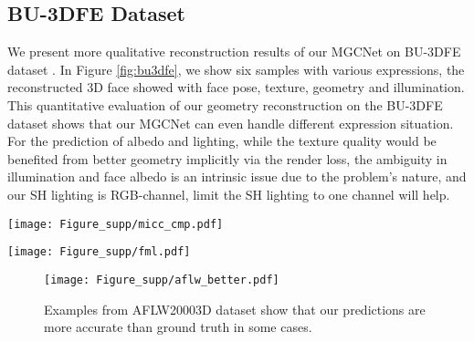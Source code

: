 \documentclass[runningheads]{llncs}
\newcommand{\etal}{\textit{et al}.}
\begin{document}
\subsection{BU-3DFE Dataset} \label{compare_bu3dfe}
We present more qualitative reconstruction results of our MGCNet on BU-3DFE dataset \cite{dataset_bu3dfe_yin20063d,dataset_bu4dfe_yin20063d}.
In Figure \ref{fig:bu3dfe}, we show six samples with various expressions, the reconstructed 3D face showed with face pose, texture, geometry and illumination.
This quantitative evaluation of our geometry reconstruction on the BU-3DFE dataset  \cite{dataset_bu3dfe_yin20063d,dataset_bu4dfe_yin20063d} shows that our MGCNet can even handle different expression situation. 
For the prediction of albedo and lighting, while the texture quality would be benefited from better geometry implicitly via the render loss, the ambiguity in illumination and face albedo is an intrinsic issue due to the problem’s nature, and our SH lighting is RGB-channel, limit the SH lighting to one channel will help.

\begin{figure*}[htb]
	\centering
	\texttt{[image: Figure\_supp/micc\_cmp.pdf]}
	\caption{Comparison with Zhu \etal \cite{dataset_aflw20003D_300WLP_zhu2016face} (3DDFA), Sanyal \etal \cite{unsuper_mul_sanyal2019learning_ring} (RingNet), Feng \etal \cite{super_fit_volu_exp_feng2018joint} (PRN), and Deng \etal \cite{unsuper_mul_ng2019accurate}.}
	\label{fig:comp_micc}
\end{figure*}

\begin{figure*}[htbp]
	\centering
	\texttt{[image: Figure\_supp/fml.pdf]}
	\caption{
		Comparison with Richardson \etal \cite{unsuper_richardson2017learning}, Sela \etal \cite{super_iter_sela2017unrestricted}, Tewari17 \etal \cite{unsuper_tewari2017mofa}, Tewari19 \etal \cite{unsuper_mul_tewari2019fml} and RingNet \etal \cite{unsuper_mul_sanyal2019learning_ring}.		
		Our MGCNet trained by multi-view consistency loss outperforms these state-of-the-art methods in face reconstruction geometry}
	\label{fig:comp_inthewild}
\end{figure*}

\begin{figure}[htbp]
	\centering
	\texttt{[image: Figure\_supp/aflw\_better.pdf]}
	\caption{Examples from AFLW20003D dataset \cite{dataset_aflw20003D_300WLP_zhu2016face} show that our predictions are more accurate than ground truth in some cases. }
	\label{fig:aflw_better}
\end{figure}
\end{document}

